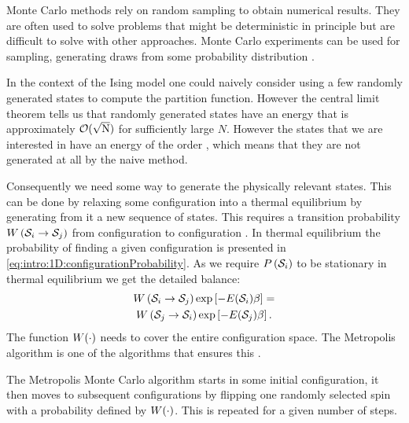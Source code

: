
Monte Carlo methods rely on random sampling to obtain numerical results. They are often used to solve problems that might be deterministic in principle but are difficult to solve with other approaches. Monte Carlo experiments can be used for sampling, \ie generating draws from some probability distribution \cite{kroese2014monte}. 

In the context of the Ising model one could naively consider using a few randomly generated states to compute the partition function. However the central limit theorem tells us that randomly generated states have an energy that is approximately $\mathcal{O}(\sqrt{\mathrm{N}})$ for sufficiently large $N$. However the states that we are interested in have an energy of the order \bigOh{\numberOfSpins}, which means that they are not generated at all by the naive method. 

Consequently we need some way to generate the physically relevant states. This can be done by relaxing some configuration into a thermal equilibrium by generating from it a new sequence of states. This requires a transition probability $W\left(\mathcal{S}_{i} \to \mathcal{S}_{j} \right)$ from configuration  to configuration . In thermal equilibrium the probability of finding a given configuration is presented in \cref{eq:intro:1D:configurationProbability}. As we require $P\left(\mathcal{S}_{i}\right)$ to be stationary in thermal equilibrium we get the detailed balance:
\begin{multline}\label{eq:intro:mcm:detailedbalance}
	W\left(\mathcal{S}_{i} \to \mathcal{S}_{j}\right)\exp\left[-E(\mathcal{S}_{i})\beta \right] = \\
	W\left(\mathcal{S}_{j} \to \mathcal{S}_{i}\right)\exp\left[-E(\mathcal{S}_{j})\beta \right].
\end{multline}
The function $W(\cdot)$ needs to cover the entire configuration space. The Metropolis algorithm is one of the algorithms that ensures this \cite{kenzel1997physics}. 

The Metropolis Monte Carlo algorithm starts in some initial configuration, it then moves to subsequent configurations by flipping one randomly selected spin with a probability defined by \mbox{$W(\cdot)$}. This is repeated for a given number of steps.